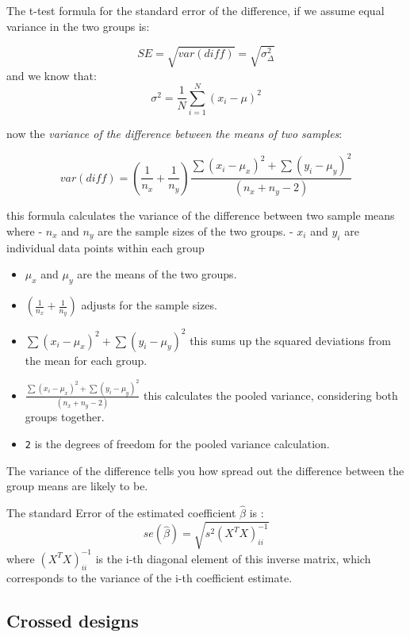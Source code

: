 \documentclass[
  letterpaper,
  DIV=11,
  numbers=noendperiod]{scrartcl}
\begin{document}
The t-test formula for the standard error of the difference, if we
assume equal variance in the two groups is:

\[
SE =\sqrt{var(diff)} = \sqrt{\sigma_{\Delta}^2}
\] and we know that: \[
\sigma^2 = \frac{1}{N}\sum^N_{i=1}(x_i-\mu)^ 2
\]

now the \emph{variance of the difference between the means of two
samples}:

\[
var(diff) = \left(\frac{1}{n_x}+\frac{1}{n_y}\right)\frac {\sum{(x_i -\mu_x)^2}+ \sum{(y_i- \mu_y)^2}}{(n_x+n_y-2)}
\]

this formula calculates the variance of the difference between two
sample means where - \(n_x\) and \(n_y\) are the sample sizes of the two
groups. - \(x_i\) and \(y_i\) are individual data points within each
group

\begin{itemize}
\item
  \(\mu_x\) and \(\mu_y\) are the means of the two groups.
\item
  \((\frac{1}{n_x}+\frac{1}{n_y})\) adjusts for the sample sizes.
\item
  \(\sum{(x_i -\mu_x)^2}+ \sum{(y_i- \mu_y)}^2\) this sums up the
  squared deviations from the mean for each group.
\item
  \(\frac {\sum{(x_i -\mu_x)^2}+ \sum{(y_i- \mu_y)^2}}{(n_x+n_y-2)}\)
  this calculates the pooled variance, considering both groups together.
\item
  \texttt{2} is the degrees of freedom for the pooled variance
  calculation.
\end{itemize}

The variance of the difference tells you how spread out the difference
between the group means are likely to be.

The standard Error of the estimated coefficient \(\hat{\beta}\) is : \[
se(\hat{\beta})=\sqrt{s^2(X^TX)^{-1}_{ii}}
\] where \((X^TX)^{-1}_{ii}\) is the i-th diagonal element of this
inverse matrix, which corresponds to the variance of the i-th
coefficient estimate.

\subsection{Crossed designs}\label{crossed-designs}
\end{document}

